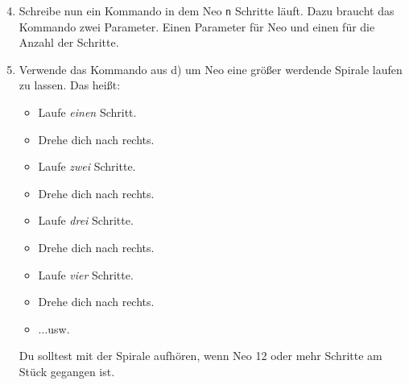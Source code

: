\begin{enumerate}\setcounter{enumi}{3}
	\item
		Schreibe nun ein Kommando in dem Neo \lstinline{n} Schritte läuft.
		Dazu braucht das Kommando zwei Parameter.
		Einen Parameter für Neo und einen für die Anzahl der Schritte.

	\item
		Verwende das Kommando aus d) um Neo eine größer werdende Spirale laufen zu lassen. 
		Das heißt:
		
		\begin{itemize}
			\item[] Laufe \emph{einen} Schritt.
			\item[] Drehe dich nach rechts.
			\item[] Laufe \emph{zwei} Schritte.
			\item[] Drehe dich nach rechts.
			\item[] Laufe \emph{drei} Schritte.
			\item[] Drehe dich nach rechts.
			\item[] Laufe \emph{vier} Schritte.
			\item[] Drehe dich nach rechts.
			\item[] ...usw.
		\end{itemize}

		Du solltest mit der Spirale aufhören, wenn Neo 12 oder mehr Schritte am Stück gegangen ist.
\end{enumerate}

\newpage
